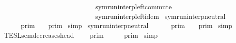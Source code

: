 \begin{isabellebody}
\ \ \ \ \ \ \ \ \ \ \ \ \ \ \ \ \ \ \ \ \ \ \ \ \ \ \ \ symrun{\isacharunderscore}interp{\isacharunderscore}left{\isacharunderscore}commute\isanewline
\ \ \ \ \ \ \ \ \ \ \ \ \ \ \ \ \ \ \ \ \ \ \ \ \ \ \ \ symrun{\isacharunderscore}interp{\isacharunderscore}left{\isacharunderscore}idem\isanewline
\isanewline
%
\isanewline
{}\isamarkupfalse%
\ symrun{\isacharunderscore}interp{\isacharunderscore}neutral{}{\isacharcolon}\isanewline
\ \ {\isacartoucheopen}{\isasymlbrakk}{\isasymlbrakk}\ {\isacharbrackleft}{\isacharbrackright}\ {\isacharat}\ {\isasymGamma}\ {\isasymrbrakk}{\isasymrbrakk}\isactrlsub p\isactrlsub r\isactrlsub i\isactrlsub m\ {\isacharequal}\ {\isasymlbrakk}{\isasymlbrakk}\ {\isasymGamma}\ {\isasymrbrakk}{\isasymrbrakk}\isactrlsub p\isactrlsub r\isactrlsub i\isactrlsub m{\isacartoucheclose}\isanewline
%
\isadelimproof
%
\endisadelimproof
%
\isatagproof
{}\isamarkupfalse%
\ simp%
\endisatagproof
{\isafoldproof}%
%
\isadelimproof
\isanewline
%
\endisadelimproof
\isanewline
{}\isamarkupfalse%
\ symrun{\isacharunderscore}interp{\isacharunderscore}neutral{}{\isacharcolon}\isanewline
\ \ {\isacartoucheopen}{\isasymlbrakk}{\isasymlbrakk}\ {\isasymGamma}\ {\isacharat}\ {\isacharbrackleft}{\isacharbrackright}\ {\isasymrbrakk}{\isasymrbrakk}\isactrlsub p\isactrlsub r\isactrlsub i\isactrlsub m\ {\isacharequal}\ {\isasymlbrakk}{\isasymlbrakk}\ {\isasymGamma}\ {\isasymrbrakk}{\isasymrbrakk}\isactrlsub p\isactrlsub r\isactrlsub i\isactrlsub m{\isacartoucheclose}\isanewline
%
\isadelimproof
%
\endisadelimproof
%
\isatagproof
{}\isamarkupfalse%
\ simp%
\endisatagproof
{\isafoldproof}%
%
\isadelimproof
%
\endisadelimproof
%
\isadelimdocument
%
\endisadelimdocument
%
\isatagdocument
%
\isamarkuptrue%
%
\endisatagdocument
{\isafolddocument}%
%
\isadelimdocument
%
\endisadelimdocument
{}\isamarkupfalse%
\ TESL{\isacharunderscore}sem{\isacharunderscore}decreases{\isacharunderscore}head{\isacharcolon}\isanewline
\ \ {\isacartoucheopen}{\isasymlbrakk}{\isasymlbrakk}\ {\isasymGamma}\ {\isasymrbrakk}{\isasymrbrakk}\isactrlsub p\isactrlsub r\isactrlsub i\isactrlsub m\ {\isasymsupseteq}\ {\isasymlbrakk}{\isasymlbrakk}\ {\isasymgamma}\ {\isacharhash}\ {\isasymGamma}\ {\isasymrbrakk}{\isasymrbrakk}\isactrlsub p\isactrlsub r\isactrlsub i\isactrlsub m{\isacartoucheclose}\isanewline
%
\isadelimproof
%
\endisadelimproof
%
\isatagproof
{}\isamarkupfalse%
\ simp%
\endisatagproof

\end{isabellebody}
